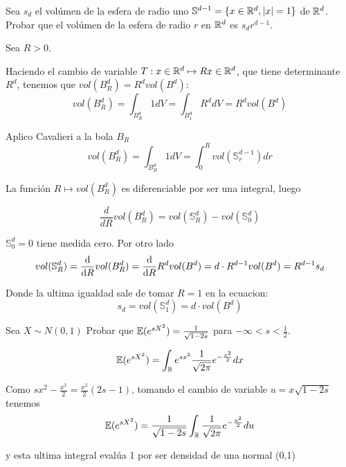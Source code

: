 \documentclass[11pt,a4paper]{article}
\begin{document}
\begin{ejercicio}{10}{
	Sea $s_d$ el vol\'umen de la esfera de radio uno $\mathbb S^{d-1} = \{x \in \mathbb R^d, |x| = 1\}$ de $\mathbb R^d$.
	Probar que el vol\'umen de la esfera de radio $r$ en $\mathbb R^d$ es $s_d r^{d-1}$.
}{
	Sea $R>0$.

	Haciendo el cambio de variable $T: x \in \mathbb R^d \mapsto Rx \in \mathbb R^d$, que tiene determinante $R^d$,
	tenemos que $vol(B_R^d) = R^d vol(B^d)$:
	$$
		vol(B_R^d)
		=
		\int_{B_R^d} 1 dV
		=
		\int_{B_1^d} R^d dV
		=
		R^d vol(B^d)
	$$

	Aplico Cavalieri a la bola $B_R$
	$$
	vol(B_R^d)
	=
	\int_{B_R^d} 1 dV
	=
	\int_0^R vol(\mathbb S_r^{d-1}) dr
	$$

	La función $R \mapsto vol(B_R^d)$ es diferenciable por ser una integral, luego

	$$
		\dfrac{d}{dR} vol(B_R^d)
		=
		vol(\mathbb S_R^d) - vol(\mathbb S_0^d)
	$$

	$\mathbb S_0^d = {0}$ tiene medida cero. Por otro lado
	$$
	vol(\mathbb S_R^d)
	=
	\dfrac{\text d}{\text d R} vol(B_R^d)
	=
	\dfrac{\text d}{\text dR} R^d vol(B^d)
	=
	d \cdot R^{d-1} vol(B^d)
	=
	R^{d-1} s_d
	$$

	Donde la ultima igualdad sale de tomar $R=1$ en la ecuacion:
	$$
	s_d
	=
	vol(\mathbb S_1^d)
	=
	d \cdot vol(B^d)
	$$

}\end{ejercicio}


\begin{ejercicio}{15}{
	Sea
	$X \sim N(0,1)$
	Probar que
	$
	\mathbb E(e^{sX^2}) = \frac{1}{\sqrt{1 - 2s}}
	$ para 
	$
	-\infty < s < \frac{1}{2}
	$.
}{
	$$
		\mathbb E(e^{sX^2})
		=
		\int_\mathbb R e^{sx^2} \frac{1}{\sqrt{2\pi}} e^{-\frac{x^2}{2}} dx
	$$

	Como $sx^2 - \frac{x^2}{2} = \frac{x^2}{2}(2s-1)$, tomando el cambio de variable $u = x\sqrt{1-2s}$ tenemos
	$$
		\mathbb E(e^{sX^2})
		=
		\frac{1}{\sqrt{1 - 2s}}
		\int_\mathbb R 
		\frac{1}{\sqrt{2\pi}}
		e^{-\frac{u^2}{2}} du	
	$$
	
	y esta ultima integral eval\'ua 1 por ser densidad de una normal (0,1) 

}\end{ejercicio}
\end{document}
